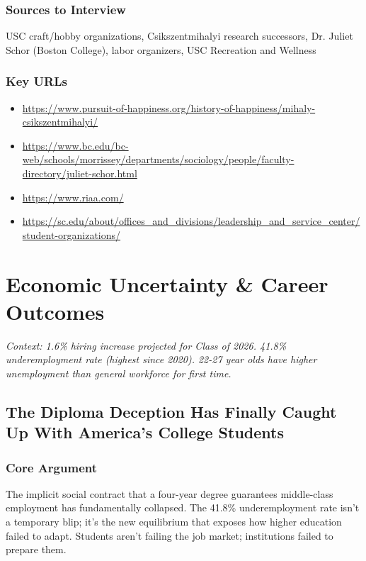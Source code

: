 \documentclass[11pt,letterpaper]{article}
\begin{document}
\subsubsection*{Sources to Interview}
USC craft/hobby organizations, Csikszentmihalyi research successors, Dr. Juliet Schor (Boston College), labor organizers, USC Recreation and Wellness

\subsubsection*{Key URLs}
\begin{itemize}[noitemsep]
    \item \url{https://www.pursuit-of-happiness.org/history-of-happiness/mihaly-csikszentmihalyi/}
    \item \url{https://www.bc.edu/bc-web/schools/morrissey/departments/sociology/people/faculty-directory/juliet-schor.html}
    \item \url{https://www.riaa.com/}
    \item \url{https://sc.edu/about/offices_and_divisions/leadership_and_service_center/student-organizations/}
\end{itemize}

\newpage
\section{Economic Uncertainty \& Career Outcomes}

\textit{Context: 1.6\% hiring increase projected for Class of 2026. 41.8\% underemployment rate (highest since 2020). 22-27 year olds have higher unemployment than general workforce for first time.}

\newpage
\subsection{The Diploma Deception Has Finally Caught Up With America's College Students}

\subsubsection*{Core Argument}
The implicit social contract that a four-year degree guarantees middle-class employment has fundamentally collapsed. The 41.8\% underemployment rate isn't a temporary blip; it's the new equilibrium that exposes how higher education failed to adapt. Students aren't failing the job market; institutions failed to prepare them.
\end{document}
